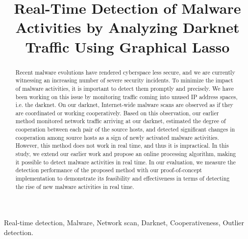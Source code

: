 \documentclass[conference]{IEEEtran}
\begin{document}
\title{
  Real-Time Detection of Malware Activities by Analyzing Darknet Traffic Using Graphical Lasso
}

\author{
}


\maketitle

\begin{abstract}
Recent malware evolutions have rendered cyberspace less secure, and we are currently witnessing an increasing number of severe security incidents.
To minimize the impact of malware activities, it is important to detect them promptly and precisely.
We have been working on this issue by monitoring traffic coming into unused IP address spaces, i.e. the darknet.
On our darknet, Internet-wide malware scans are observed as if they are coordinated or working cooperatively.
Based on this observation, our earlier method monitored network traffic arriving at our darknet, estimated the degree of cooperation between each pair of the source hosts, and detected significant changes in cooperation among source hosts as a sign of newly activated malware activities.
However, this method does not work in real time, and thus it is impractical.
In this study, we extend our earlier work and propose an online processing algorithm, making it possible to detect malware activities in real time.
In our evaluation, we measure the detection performance of the proposed method with our proof-of-concept implementation to demonstrate its feasibility and effectiveness in terms of detecting the rise of new malware activities in real time.
\end{abstract}

\begin{IEEEkeywords}
Real-time detection, Malware, Network scan, Darknet, Cooperativeness, Outlier detection.
\end{IEEEkeywords}
\end{document}
